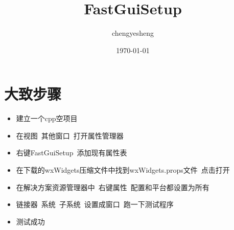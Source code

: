\documentclass[11pt,a4paper]{article}
\title{FastGuiSetup}
\author{chengyesheng}
\date{\today}
\begin{document}
	\maketitle
	\section{大致步骤}
	\begin{itemize}
		\item 建立一个cpp空项目
		\item 在视图\ 其他窗口\ 打开属性管理器
		\item 右键FastGuiSetup\ 添加现有属性表
		\item 在下载的wxWidgets压缩文件中找到wxWidgets.props文件\ 点击打开
		\item 在解决方案资源管理器中\ 右键属性\ 配置和平台都设置为所有
		
		\item 链接器\ 系统\ 子系统\ 设置成窗口\ 跑一下测试程序
		
		\item 测试成功
	\end{itemize}
\end{document}
